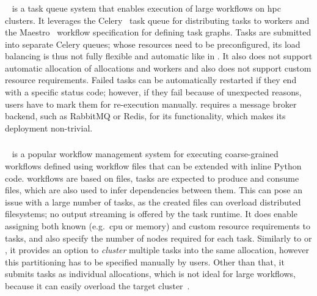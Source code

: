 \subsubsection*{\merlin}
\merlin~\cite{merlin} is a task queue system that enables execution of large workflows on
\gls{hpc} clusters. It leverages the Celery~\cite{celery} task queue for
distributing tasks to
workers and the Maestro~\cite{maestro} workflow specification for defining task graphs.
Tasks are submitted into separate Celery queues; whose resources need to be preconfigured, its load
balancing is thus not fully flexible and automatic like in \hyperqueue{}. It also does
not support automatic allocation of allocations and workers and also does not support custom
resource requirements. Failed tasks can be automatically restarted if they end with a specific
status code; however, if they fail because of unexpected reasons, users have to mark them for
re-execution manually. \merlin{} requires a message broker backend, such as RabbitMQ
or Redis, for its functionality, which makes its deployment non-trivial.

\subsubsection*{\snakemake}
\snakemake~\cite{snakemake} is a popular workflow management system for executing
coarse-grained workflows defined using workflow files that can be extended with inline Python code.
\snakemake{} workflows are based on files, tasks are expected to produce and consume
files, which are also used to infer dependencies between them. This can pose an issue with a large
number of tasks, as the created files can overload distributed filesystems; no output streaming is
offered by the task runtime. It does enable assigning both known (e.g.\ \gls{cpu} or
memory) and custom resource requirements to tasks, and also specify the number of nodes required
for each task. Similarly to \pegasus{} or \autosubmit{}, it provides an
option to \emph{cluster} multiple tasks into the same allocation, however this
partitioning has to be specified manually by users. Other than that, it submits tasks as individual
allocations, which is not ideal for large workflows, because it can easily overload the target
cluster~\cite{nersc-snakemake}.

